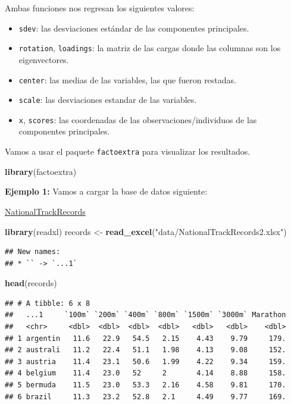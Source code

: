 \documentclass[
]{book}
\newenvironment{Shaded}{\begin{snugshade}}{\end{snugshade}}
\newcommand{\FunctionTok}[1]{\textcolor[rgb]{0.13,0.29,0.53}{\textbf{#1}}}
\newcommand{\NormalTok}[1]{#1}
\newcommand{\OtherTok}[1]{\textcolor[rgb]{0.56,0.35,0.01}{#1}}
\newcommand{\StringTok}[1]{\textcolor[rgb]{0.31,0.60,0.02}{#1}}
\providecommand{\tightlist}{%
  \setlength{\itemsep}{0pt}\setlength{\parskip}{0pt}}
\begin{document}
Ambas funciones nos regresan los siguientes valores:

\begin{itemize}
\tightlist
\item
  \texttt{sdev}: las desviaciones estándar de las componentes principales.
\item
  \texttt{rotation}, \texttt{loadings}: la matriz de las cargas donde las columnas son los eigenvectores.
\item
  \texttt{center}: las medias de las variables, las que fueron restadas.
\item
  \texttt{scale}: las desviaciones estandar de las variables.
\item
  \texttt{x}, \texttt{scores}: las coordenadas de las observaciones/individuos de las componentes principales.
\end{itemize}

Vamos a usar el paquete \texttt{factoextra} para visualizar los resultados.

\begin{Shaded}
\begin{Highlighting}[]
\FunctionTok{library}\NormalTok{(factoextra)}
\end{Highlighting}
\end{Shaded}

\textbf{Ejemplo 1:} Vamos a cargar la base de datos siguiente:

\href{https://github.com/HaydeePeruyero/MultivariateStatisticalAnalysis/blob/main/data/NationalTrackRecords2.xlsx}{NationalTrackRecords}

\begin{Shaded}
\begin{Highlighting}[]
\FunctionTok{library}\NormalTok{(readxl)}
\NormalTok{records }\OtherTok{\textless{}{-}} \FunctionTok{read\_excel}\NormalTok{(}\StringTok{"data/NationalTrackRecords2.xlsx"}\NormalTok{)}
\end{Highlighting}
\end{Shaded}

\begin{verbatim}
## New names:
## * `` -> `...1`
\end{verbatim}

\begin{Shaded}
\begin{Highlighting}[]
\FunctionTok{head}\NormalTok{(records)}
\end{Highlighting}
\end{Shaded}

\begin{verbatim}
## # A tibble: 6 x 8
##   ...1     `100m` `200m` `400m` `800m` `1500m` `3000m` Marathon
##   <chr>     <dbl>  <dbl>  <dbl>  <dbl>   <dbl>   <dbl>    <dbl>
## 1 argentin   11.6   22.9   54.5   2.15    4.43    9.79     179.
## 2 australi   11.2   22.4   51.1   1.98    4.13    9.08     152.
## 3 austria    11.4   23.1   50.6   1.99    4.22    9.34     159.
## 4 belgium    11.4   23.0   52     2       4.14    8.88     158.
## 5 bermuda    11.5   23.0   53.3   2.16    4.58    9.81     170.
## 6 brazil     11.3   23.2   52.8   2.1     4.49    9.77     169.
\end{verbatim}
\end{document}
